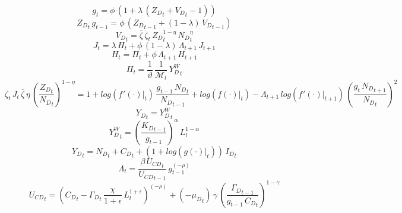 \documentclass[10pt,a4paper]{article}
\begin{document}
\footnotesize
\begin{dmath}
{g}_{t}=\phi\, \left(1+\lambda\, \left({Z_D}_{t}+{V_D}_{t}-1\right)\right)
\end{dmath}
\begin{dmath}
{Z_D}_{t}\, {g}_{t-1}=\phi\, \left({Z_D}_{t-1}+\left(1-\lambda\right)\, {V_D}_{t-1}\right)
\end{dmath}
\begin{dmath}
{V_D}_{t}=\overline{\zeta}\, {\zeta}_{t}\, {Z_D}_{t}^{1-\eta}\, {N_D}_{t}^{\eta}
\end{dmath}
\begin{dmath}
{J}_{t}=\lambda\, {H}_{t}+\phi\, \left(1-\lambda\right)\, {\Lambda}_{t+1}\, {J}_{t+1}
\end{dmath}
\begin{dmath}
{H}_{t}={\Pi}_{t}+\phi\, {\Lambda}_{t+1}\, {H}_{t+1}
\end{dmath}
\begin{dmath}
{\Pi}_{t}=\frac{1}{\vartheta}\, \frac{1}{\mathcal{M}_{t}}\, {Y^W_D}_{t}
\end{dmath}
\begin{dmath}
{\zeta}_{t}\, {J}_{t}\, \overline{\zeta}\, \eta\, \left(\frac{{Z_D}_{t}}{{N_D}_{t}}\right)^{1-\eta}=1+log\left({\left.       f^‎{\prime}\left( \cdot \right)   \right|}_{t}\right)\, \frac{{g}_{t-1}\, {N_D}_{t}}{{N_D}_{t-1}}+log\left({\left.       f\left( \cdot \right)            \right|}_{t}\right)-{\Lambda}_{t+1}\, log\left({\left.       f^‎{\prime}\left( \cdot \right)   \right|}_{t+1}\right)\, \left(\frac{{g}_{t}\, {N_D}_{t+1}}{{N_D}_{t}}\right)^{2}
\end{dmath}
\begin{dmath}
{Y_D}_{t}={Y^W_D}_{t}
\end{dmath}
\begin{dmath}
{Y^W_D}_{t}=\left(\frac{{K_D}_{t-1}}{{g}_{t-1}}\right)^{\alpha}\, {L}_{t}^{1-\alpha}
\end{dmath}
\begin{dmath}
{Y_D}_{t}={N_D}_{t}+{C_D}_{t}+\left(1+log\left({\left.       g\left( \cdot \right)            \right|}_{t}\right)\right)\, {I_D}_{t}
\end{dmath}
\begin{dmath}
{\Lambda}_{t}=\frac{\beta\, {U_{CD}}_{t}}{{U_{CD}}_{t-1}}\, {g}_{t-1}^{\left(-\rho\right)}
\end{dmath}
\begin{dmath}
{U_{CD}}_{t}=\left({C_D}_{t}-{\Gamma_D}_{t}\, \frac{\chi}{1+\epsilon}\, {L}_{t}^{1+\epsilon}\right)^{\left(-\rho\right)}+\left(-{{\mu}_{D}}_{t}\right)\, \gamma\, \left(\frac{{\Gamma_D}_{t-1}}{{g}_{t-1}\, {C_D}_{t}}\right)^{1-\gamma}
\end{dmath}
\end{document}
